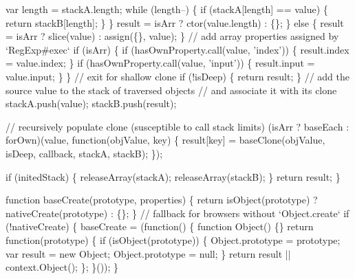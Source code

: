 \begin{DoxyCodeInclude}
        var length = stackA.length;
        \textcolor{keywordflow}{while} (length--) \{
          \textcolor{keywordflow}{if} (stackA[length] == value) \{
            \textcolor{keywordflow}{return} stackB[length];
          \}
        \}
        result = isArr ? ctor(value.length) : \{\};
      \}
      \textcolor{keywordflow}{else} \{
        result = isArr ? slice(value) : assign(\{\}, value);
      \}
      \textcolor{comment}{// add array properties assigned by `RegExp#exec`}
      \textcolor{keywordflow}{if} (isArr) \{
        \textcolor{keywordflow}{if} (hasOwnProperty.call(value, \textcolor{stringliteral}{'index'})) \{
          result.index = value.index;
        \}
        \textcolor{keywordflow}{if} (hasOwnProperty.call(value, \textcolor{stringliteral}{'input'})) \{
          result.input = value.input;
        \}
      \}
      \textcolor{comment}{// exit for shallow clone}
      \textcolor{keywordflow}{if} (!isDeep) \{
        \textcolor{keywordflow}{return} result;
      \}
      \textcolor{comment}{// add the source value to the stack of traversed objects}
      \textcolor{comment}{// and associate it with its clone}
      stackA.push(value);
      stackB.push(result);

      \textcolor{comment}{// recursively populate clone (susceptible to call stack limits)}
      (isArr ? baseEach : forOwn)(value, \textcolor{keyword}{function}(objValue, key) \{
        result[key] = baseClone(objValue, isDeep, callback, stackA, stackB);
      \});

      \textcolor{keywordflow}{if} (initedStack) \{
        releaseArray(stackA);
        releaseArray(stackB);
      \}
      \textcolor{keywordflow}{return} result;
    \}

    \textcolor{keyword}{function} baseCreate(prototype, properties) \{
      \textcolor{keywordflow}{return} isObject(prototype) ? nativeCreate(prototype) : \{\};
    \}
    \textcolor{comment}{// fallback for browsers without `Object.create`}
    \textcolor{keywordflow}{if} (!nativeCreate) \{
      baseCreate = (\textcolor{keyword}{function}() \{
        \textcolor{keyword}{function} Object() \{\}
        \textcolor{keywordflow}{return} \textcolor{keyword}{function}(prototype) \{
          \textcolor{keywordflow}{if} (isObject(prototype)) \{
            Object.prototype = prototype;
            var result = \textcolor{keyword}{new} Object;
            Object.prototype = null;
          \}
          \textcolor{keywordflow}{return} result || context.Object();
        \};
      \}());
    \}


\end{DoxyCodeInclude}
